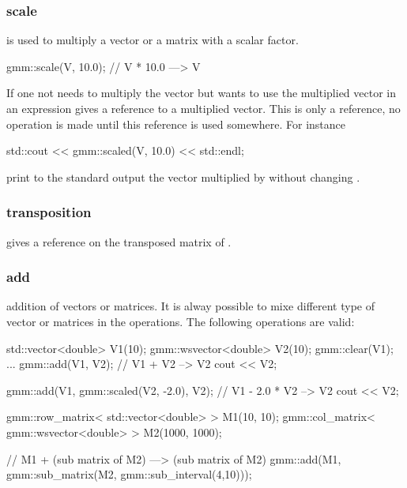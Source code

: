 \documentclass[11pt,a4paper]{article}
\begin{document}
\subsubsection{scale}
 is used to multiply a vector or a matrix with a scalar factor.
\begin{cppcode}
  gmm::scale(V, 10.0);  // V * 10.0 ---> V
\end{cppcode}
If one not needs to multiply the vector but wants to use the multiplied vector in an expression   gives a reference to a multiplied vector. This is only a reference, no operation is made until this reference is used somewhere. For instance
\begin{cppcode}
  std::cout << gmm::scaled(V, 10.0) << std::endl;
\end{cppcode}
print to the standard output the vector  multiplied by  without changing .

\subsubsection{transposition}
 gives a reference on the transposed matrix of .


\subsubsection{add}
addition of vectors or matrices. It is alway possible to mixe different type of vector or matrices in the operations. The following operations are valid:
\begin{cppcode}
  std::vector<double> V1(10);
  gmm::wsvector<double> V2(10);
  gmm::clear(V1);
  ...
  gmm::add(V1, V2); // V1 + V2 --> V2
  cout << V2;

  gmm::add(V1, gmm::scaled(V2, -2.0), V2); // V1 - 2.0 * V2 --> V2
  cout << V2;

  gmm::row_matrix< std::vector<double> > M1(10, 10);
  gmm::col_matrix< gmm::wsvector<double> > M2(1000, 1000);

  // M1 + (sub matrix of M2) ---> (sub matrix of M2)
  gmm::add(M1, gmm::sub_matrix(M2, gmm::sub_interval(4,10)));
\end{cppcode}
\end{document}
